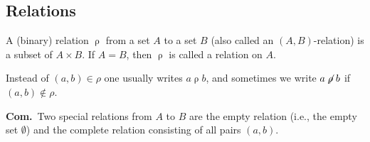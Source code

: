 \documentclass[a4paper]{extarticle}
\newcommand{\Com}{\textbf{Com.}\ }
\newcommand{\relrho}{\mathrel{\rho}}
\begin{document}
\begin{multicols*}{2}
\subsection{Relations}

\Def[Relation] A (binary) relation $\relrho$ from a set $A$ to a set $B$ (also
called an $(A,B)$-relation) is a subset of $A\times B$. If $A=B$, then $\relrho$ is
called a relation on $A$.

Instead of $(a,b)\in\rho$ one usually writes $a \relrho b$, and sometimes we
write $a \not\relrho b$ if $(a,b)\notin \rho$.

\Com Two special relations from $A$ to $B$ are the empty relation (i.e., the
empty set $\emptyset$) and the complete relation consisting of all pairs $(a,b)$.

\end{multicols*}
\end{document}
